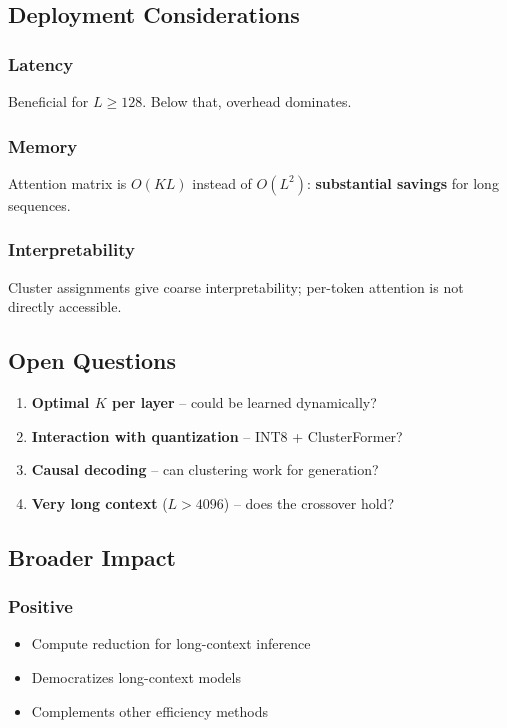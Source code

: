 \subsection{Deployment Considerations}

\subsubsection{Latency}

Beneficial for $L \geq 128$. Below that, overhead dominates.

\subsubsection{Memory}

Attention matrix is $O(KL)$ instead of $O(L^2)$: \textbf{substantial savings} 
for long sequences.

\subsubsection{Interpretability}

Cluster assignments give coarse interpretability; per-token attention is 
not directly accessible.

\subsection{Open Questions}

\begin{enumerate}
\item \textbf{Optimal $K$ per layer} -- could be learned dynamically?
\item \textbf{Interaction with quantization} -- INT8 + ClusterFormer?
\item \textbf{Causal decoding} -- can clustering work for generation?
\item \textbf{Very long context} ($L > 4096$) -- does the crossover hold?

\end{enumerate}
\subsection{Broader Impact}

\subsubsection{Positive}
\begin{itemize}
\item Compute reduction for long-context inference
\item Democratizes long-context models
\item Complements other efficiency methods

\end{itemize}
